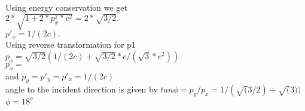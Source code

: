 \documentclass[10pt, a4paper]{article}
\begin{document}
\begin{enumerate}
{Using energy conservation we get\\
\begin{math} 2*\sqrt{1+2*p_x^2*c^2} = 2*\sqrt{3/2}.\end{math}\\
\begin{math} p'_x = 1/(2c).\end{math}\\
Using reverse transformation for p1\\
\begin{math} p_x = \sqrt{3/2} (1/(2c) + \sqrt{3/2}*c/(\sqrt3 * c^2))\end{math}\\
\begin{math} p_x = \end{math}\\
and
\begin{math} p_y = p'_y = p'_x = 1/(2c)\end{math}\\
angle to the incident direction is given by
\begin{math} tan \phi = p_y/p_x = 1/(\sqrt(3/2) + \sqrt(3)) \end{math}\\
\begin{math} \phi = 18^o\end{math}\\
}

\end{enumerate}
\end{document}
